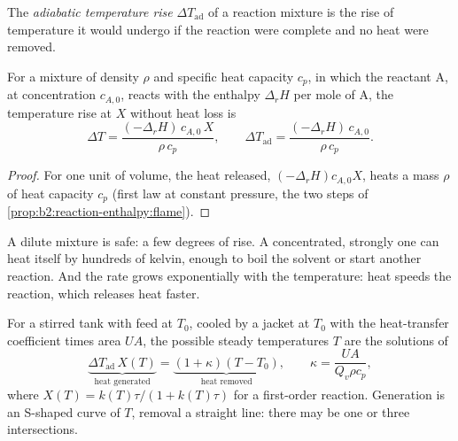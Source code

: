 \begin{definition}\label{def:b2:continuous-reactors:adiabatic-rise}
The \emph{adiabatic temperature rise}
$\Delta T_{\text{ad}}$ of a reaction mixture is the rise of temperature it
would undergo if the reaction were complete and no heat were removed.
\end{definition}

\begin{proposition}\label{prop:b2:continuous-reactors:adiabatic}
For a mixture of density $\rho$ and specific heat capacity $c_p$, in which
the reactant A, at concentration $c_{A,0}$, reacts with the enthalpy
$\Delta_r H$ per mole of A, the temperature rise at  $X$ without
heat loss is
\[
  \Delta T = \frac{(-\Delta_r H)\,c_{A,0}\,X}{\rho\,c_p}, \qquad
  \Delta T_{\text{ad}} = \frac{(-\Delta_r H)\,c_{A,0}}{\rho\,c_p} .
\]
\end{proposition}

\begin{proof}
For one unit of volume, the heat released, $(-\Delta_r H)c_{A,0}X$, heats a
mass $\rho$ of heat capacity $c_p$ (first law at constant pressure, the two
steps of \cref{prop:b2:reaction-enthalpy:flame}).
\end{proof}

A dilute mixture is safe: a few degrees of rise. A concentrated, strongly
 one can heat itself by hundreds of kelvin, enough to boil the
solvent or start another reaction. And the rate grows exponentially with the
temperature: heat speeds the reaction, which releases heat faster.

\begin{proposition}\label{prop:b2:continuous-reactors:steady-states}
For a stirred tank with feed at $T_0$, cooled by a jacket at $T_0$ with the
heat-transfer coefficient times area $UA$, the possible steady temperatures
$T$ are the solutions of
\[
  \underbrace{\Delta T_{\text{ad}}\,X(T)}_{\text{heat generated}} =
  \underbrace{(1 + \kappa)(T - T_0)}_{\text{heat removed}}, \qquad
  \kappa = \frac{UA}{Q_v\rho c_p},
\]
where $X(T) = k(T)\tau/(1 + k(T)\tau)$ for a first-order reaction. Generation is
an S-shaped curve of $T$, removal a straight line: there may be one or three
intersections.
\end{proposition}

